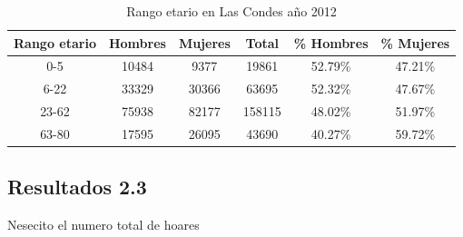 \documentclass[12pt]{article} %
\begin{document}
\begin{table}[h!]
    \centering
    \caption{Rango etario en Las Condes año 2012}
    \begin{tabular}{|c|c|c|c|c|c|}
    \hline
    \textbf{Rango etario} & \textbf{Hombres} & \textbf{Mujeres} & \textbf{Total} & \textbf{\% Hombres} & \textbf{\% Mujeres} \\ \hline
    0-5 & 10484 & 9377 & 19861 & 52.79\% & 47.21\% \\ \hline
    6-22 & 33329 & 30366 & 63695 & 52.32\% & 47.67\% \\ \hline
    23-62 & 75938 & 82177 & 158115 & 48.02\% & 51.97\% \\ \hline
    63-80 & 17595 & 26095 & 43690 & 40.27\% & 59.72\% \\ \hline
    \end{tabular}
    \label{Cuadro 3}
\end{table}
    

\subsection{Resultados 2.3}

Nesecito el numero total de hoares


\end{document}
